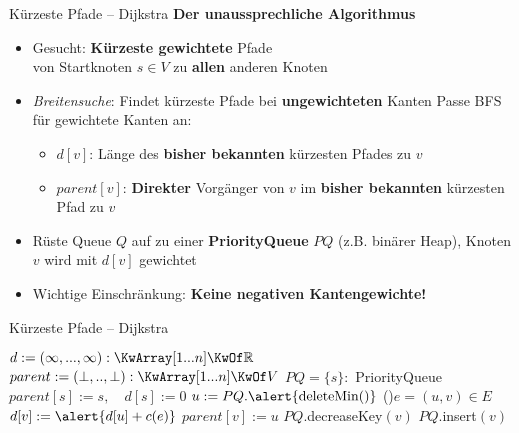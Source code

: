 \begin{frame}{Kürzeste Pfade – Dijkstra}
	\textbf{Der unaussprechliche Algorithmus} 
	\begin{itemize}
		\item Gesucht: \textbf{Kürzeste gewichtete} Pfade \\
		von Startknoten $s \in V$ zu \textbf{allen} anderen Knoten
		\pause
		\item \textit{Breitensuche}: Findet kürzeste Pfade bei \textbf{ungewichteten} Kanten
		\pause
		\implitem Passe BFS für gewichtete Kanten an: 
		\begin{itemize}
			\item $d[v]$: Länge des \textbf{bisher bekannten} kürzesten Pfades zu $v$ 
			\vspace{.2\baselineskip}
			\item $parent[v]$: \textbf{Direkter} Vorgänger von $v$ im \textbf{bisher bekannten} kürzesten Pfad zu $v$
		\end{itemize}
		\pause
		\item Rüste Queue $Q$ auf zu einer \textbf{PriorityQueue} $PQ$ (z.B. binärer Heap), Knoten $v$ wird mit $d[v]$ gewichtet
		\pause
		\item \alert{Wichtige Einschränkung: \textbf{Keine negativen Kantengewichte!}}
	\end{itemize}
\end{frame}

\begin{frame}{Kürzeste Pfade – Dijkstra}  \vspace{-.25\baselineskip}
	\begin{exampleblock}{} \vspace{-.4\baselineskip}
		\begin{algorithm}[H]
			\small
			 {
				$d := (\infty, ..., \infty) : \KwArray[1...n] \KwOf \R$\;
				$parent := (\bot, .., \bot) : \KwArray[1...n] \KwOf V$\;
				$PQ = \{s\} : $ \alert{PriorityQueue}\;
				$parent[s] := s, \quad d[s] := 0$ \;
				 {
					$u := PQ.\alert{\|deleteMin|()}$  \;
					\ForEach(){$e = (u, v) \in E$} {
						 {
							$d[v] := \alert{d[u] + c(e)}$\;
							$parent[v] := u$\;
							 {
								\alert{$PQ.$decreaseKey$(v)$}\;
							}{
								$PQ.$insert$(v)$\;
							} \vspace{-.2\baselineskip}
						} \vspace{-.2\baselineskip}
					} \vspace{-.2\baselineskip}
				}
				\;
			}
		\end{algorithm} \vspace{-.4\baselineskip}
	\end{exampleblock}
\end{frame}

